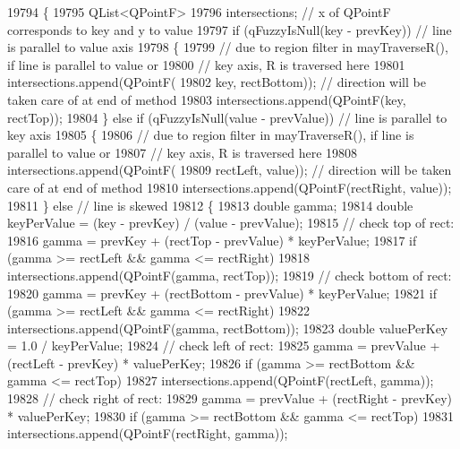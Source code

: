 \begin{DoxyCode}
19794                                                   \{
19795   QList<QPointF>
19796       intersections; \textcolor{comment}{// x of QPointF corresponds to key and y to value}
19797   \textcolor{keywordflow}{if} (qFuzzyIsNull(key - prevKey)) \textcolor{comment}{// line is parallel to value axis}
19798   \{
19799     \textcolor{comment}{// due to region filter in mayTraverseR(), if line is parallel to value or}
19800     \textcolor{comment}{// key axis, R is traversed here}
19801     intersections.append(QPointF(
19802         key, rectBottom)); \textcolor{comment}{// direction will be taken care of at end of method}
19803     intersections.append(QPointF(key, rectTop));
19804   \} \textcolor{keywordflow}{else} \textcolor{keywordflow}{if} (qFuzzyIsNull(value - prevValue)) \textcolor{comment}{// line is parallel to key axis}
19805   \{
19806     \textcolor{comment}{// due to region filter in mayTraverseR(), if line is parallel to value or}
19807     \textcolor{comment}{// key axis, R is traversed here}
19808     intersections.append(QPointF(
19809         rectLeft, value)); \textcolor{comment}{// direction will be taken care of at end of method}
19810     intersections.append(QPointF(rectRight, value));
19811   \} \textcolor{keywordflow}{else} \textcolor{comment}{// line is skewed}
19812   \{
19813     \textcolor{keywordtype}{double} gamma;
19814     \textcolor{keywordtype}{double} keyPerValue = (key - prevKey) / (value - prevValue);
19815     \textcolor{comment}{// check top of rect:}
19816     gamma = prevKey + (rectTop - prevValue) * keyPerValue;
19817     \textcolor{keywordflow}{if} (gamma >= rectLeft && gamma <= rectRight)
19818       intersections.append(QPointF(gamma, rectTop));
19819     \textcolor{comment}{// check bottom of rect:}
19820     gamma = prevKey + (rectBottom - prevValue) * keyPerValue;
19821     \textcolor{keywordflow}{if} (gamma >= rectLeft && gamma <= rectRight)
19822       intersections.append(QPointF(gamma, rectBottom));
19823     \textcolor{keywordtype}{double} valuePerKey = 1.0 / keyPerValue;
19824     \textcolor{comment}{// check left of rect:}
19825     gamma = prevValue + (rectLeft - prevKey) * valuePerKey;
19826     \textcolor{keywordflow}{if} (gamma >= rectBottom && gamma <= rectTop)
19827       intersections.append(QPointF(rectLeft, gamma));
19828     \textcolor{comment}{// check right of rect:}
19829     gamma = prevValue + (rectRight - prevKey) * valuePerKey;
19830     \textcolor{keywordflow}{if} (gamma >= rectBottom && gamma <= rectTop)
19831       intersections.append(QPointF(rectRight, gamma));

\end{DoxyCode}
